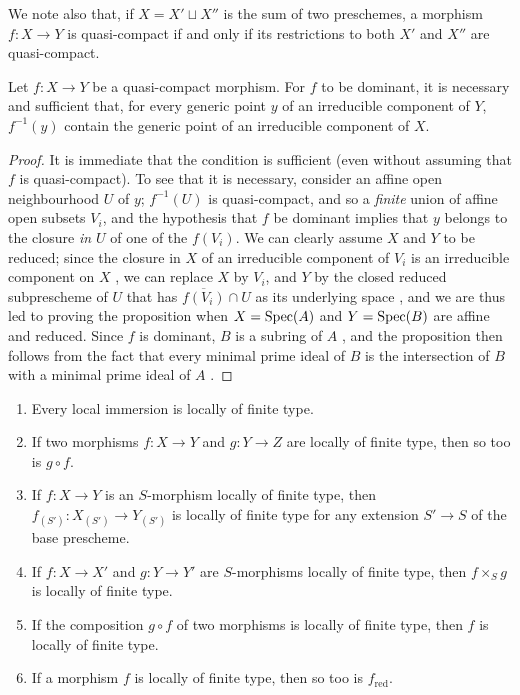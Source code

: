 We note also that, if $X=X'\sqcup X''$ is the sum of two preschemes, a morphism $f:X\to Y$ is quasi-compact if and only if its restrictions to both $X'$ and $X''$ are quasi-compact.

\begin{prop}[6.6.5]
\label{1.6.6.5}
Let $f:X\to Y$ be a quasi-compact morphism.
For $f$ to be dominant, it is necessary and sufficient that, for every generic point $y$ of an irreducible component of $Y$, $f^{-1}(y)$ contain the generic point of an irreducible component of $X$.
\end{prop}

\begin{proof}
\label{proof-1.6.6.5}
It is immediate that the condition is sufficient (even without assuming that $f$ is quasi-compact).
To see that it is necessary, consider an affine open neighbourhood $U$ of $y$;
$f^{-1}(U)$ is quasi-compact, and so a \emph{finite} union of affine open subsets $V_i$, and the hypothesis that $f$ be dominant implies that $y$ belongs to the closure \emph{in $U$} of one of the $f(V_i)$.
We can clearly assume $X$ and $Y$ to be reduced;
since the closure in $X$ of an irreducible component of $V_i$ is an irreducible component on $X$ , we can replace $X$ by $V_i$, and $Y$ by the closed reduced subprescheme of $U$ that has $\overline{f(V_i)}\cap U$ as its underlying space , and we are thus led to proving the proposition when $X={\mathop{\mathrm{Spec}}\nolimits}(A)$ and $Y={\mathop{\mathrm{Spec}}\nolimits}(B)$ are affine and reduced.
Since $f$ is dominant, $B$ is a subring of $A$ , and the proposition then follows from the fact that every minimal prime ideal of $B$ is the intersection of $B$ with a minimal prime ideal of $A$ .
\end{proof}

\begin{prop}[6.6.6]
\label{1.6.6.6}
\begin{enumerate}[label=\emph{(\alph*)}]
    \item Every local immersion is locally of finite type.
    \item If two morphisms $f:X\to Y$ and $g:Y\to Z$ are locally of finite type, then so too is $g\circ f$.
    \item If $f:X\to Y$ is an $S$-morphism locally of finite type, then $f_{(S')}:X_{(S')}\to Y_{(S')}$ is locally of finite type for any extension $S'\to S$ of the base prescheme.
    \item If $f:X\to X'$ and $g:Y\to Y'$ are $S$-morphisms locally of finite type, then $f\times_S g$ is locally of finite type.
    \item If the composition $g\circ f$ of two morphisms is locally of finite type, then $f$ is locally of finite type.
    \item If a morphism $f$ is locally of finite type, then so too is $f_\mathrm{red}$.
\end{enumerate}
\end{prop}

